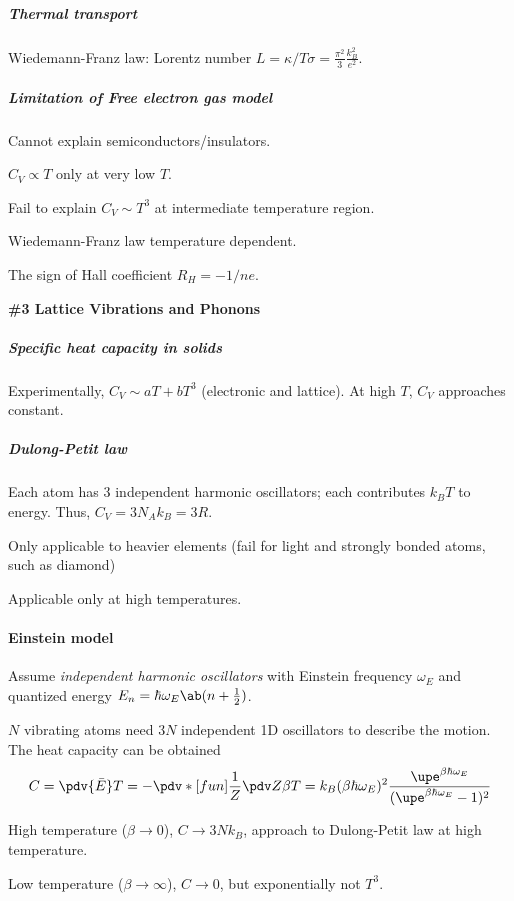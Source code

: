 \subparagraph{Thermal transport}

Wiedemann-Franz law:
Lorentz number $L = \kappa/T\sigma = \frac{\pi^2}{3}\frac{k_B^2}{e^2}$.

\subparagraph{Limitation of Free electron gas model}

\begin{enumext}
  \item Cannot explain semiconductors/insulators.
  \item $C_V \propto T$ only at very low $T$.
  \item Fail to explain $C_V \sim T^3$ at intermediate temperature region.
  \item Wiedemann-Franz law temperature dependent.
  \item The sign of Hall coefficient $R_H = -1/ne$.
\end{enumext}

\begin{framed}\large\bfseries
  \#3 Lattice Vibrations and Phonons
\end{framed}

\subparagraph{Specific heat capacity in solids}

Experimentally, $C_V \sim aT + bT^3$ (electronic and lattice).
At high $T$, $C_V$ approaches constant.

\subparagraph{Dulong-Petit law}

Each atom has $3$ independent harmonic oscillators; each contributes $k_BT$ to
energy. Thus, $C_V = 3N_Ak_B = 3R$.
\begin{enumext}
  \item Only applicable to heavier elements (fail for light and
  strongly bonded atoms, such as diamond)
  \item Applicable only at high temperatures.
\end{enumext}

\paragraph{Einstein model}

Assume \emph{independent harmonic oscillators} with Einstein
frequency $\omega_E$ and quantized
energy $E_n = \hbar\omega_E\ab(n + \frac12)$.

$N$ vibrating atoms need $3N$ independent 1D oscillators to
describe the motion.
The heat capacity can be obtained
\[
  C = \pdv{\bar E}T = -\pdv*[fun]{\frac1Z\pdv Z\beta}T
  = k_B(\beta\hbar\omega_E)^2
      \frac{\upe^{\beta\hbar\omega_E}}{(\upe^{\beta\hbar\omega_E} - 1)^2}
\]
\begin{enumext}
  \item High temperature ($\beta \to 0$), $C \to 3Nk_B$,
  approach to Dulong-Petit law at high temperature.
  \item Low temperature ($\beta \to \infty$), $C \to 0$,
  but exponentially not $T^3$.
\end{enumext}

